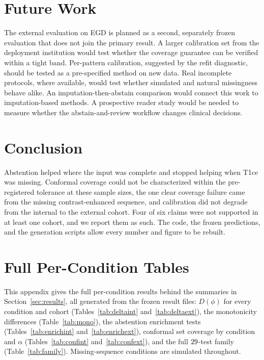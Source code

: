 \documentclass[journal]{IEEEtran}
\begin{document}
\section{Future Work}
\label{sec:future}
The external evaluation on EGD is planned as a second, separately frozen evaluation that does not join the primary result. A larger calibration set from the deployment institution would test whether the coverage guarantee can be verified within a tight band. Per-pattern calibration, suggested by the refit diagnostic, should be tested as a pre-specified method on new data. Real incomplete protocols, where available, would test whether simulated and natural missingness behave alike. An imputation-then-abstain comparison would connect this work to imputation-based methods. A prospective reader study would be needed to measure whether the abstain-and-review workflow changes clinical decisions.

\section{Conclusion}
Abstention helped where the input was complete and stopped helping when T1ce was missing. Conformal coverage could not be characterized within the pre-registered tolerance at these sample sizes, the one clear coverage failure came from the missing contrast-enhanced sequence, and calibration did not degrade from the internal to the external cohort. Four of six claims were not supported in at least one cohort, and we report them as such. The code, the frozen predictions, and the generation scripts allow every number and figure to be rebuilt.

\clearpage
\onecolumn
\appendices

\section{Full Per-Condition Tables}
\label{app:tables}
This appendix gives the full per-condition results behind the summaries in Section~\ref{sec:results}, all generated from the frozen result files: $D(\phi)$ for every condition and cohort (Tables~\ref{tab:deltaint} and~\ref{tab:deltaext}), the monotonicity differences (Table~\ref{tab:mono}), the abstention enrichment tests (Tables~\ref{tab:enrichint} and~\ref{tab:enrichext}), conformal set coverage by condition and $\alpha$ (Tables~\ref{tab:confint} and~\ref{tab:confext}), and the full $29$-test family (Table~\ref{tab:family}). Missing-sequence conditions are simulated throughout.
\end{document}

